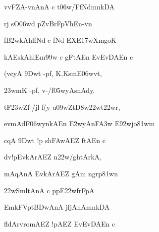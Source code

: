 {\dn v\?vFZA-vnAnA\2 c t\306w/FfNdmn\?kDA \vegdn\dontdisplaylinenum}

{\dn {}rj sO\306wd pZvB\?rFpVhEn-vn \dontdisplaylinenum}

{\dn f\3B2wkAhlfNd\2 c fNd\2 EXE\317wXmgoK \vegdn\dontdisplaylinenum}

{\dn kA\2EskAhlEm\399w\2 c gFtAEn EvEvDAEn c{\dandabdn} \dontdisplaylinenum}



{\dn (vcyA \39Dwt\? -pf\0, K,KsmE\306wvt, \vegdn\dontdisplaylinenum}

{\dn {}\323wmK\2 -pf\0, v-/f\305wyAsnAdy,{\dandabdn} \dontdisplaylinenum}

{\dn tF\323wZf-/jl\2 f\4(y u\309wZt\3D8w\322wt\?\322wr, \vegdn\dontdisplaylinenum}

{\dn evmAdF\306wyn\?kAEn \3E2w\?yAnF\3A3w\2 E\392wjo\381wm{\dandabdn} \dontdisplaylinenum}



{\dn cqA \39Dwt\? !p\2 sh\3FAwAEZ ftAEn c \vegdn\dontdisplaylinenum}

{\dn d\?v!pEvkArAEZ n\322w/g\5htArkA,{\dandabdn} \dontdisplaylinenum}

{\dn mAqAnA\2 EvkArAEZ g\5Am\2 ngrp\381wn \vegdn\dontdisplaylinenum}

{\dn {}\322wSmltAnA\2 c ppE\322wfrFpA\2{\dandabdn} \dontdisplaylinenum}

{\dn {}EmkFVpt\3BDwAnA\2 jljAnAmn\?kDA \vegdn\dontdisplaylinenum}

{\dn f\4ldArvromAEZ !pAEZ EvEvDAEn c{\dandabdn} \dontdisplaylinenum}

